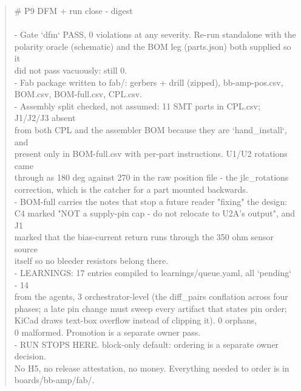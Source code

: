 \documentclass[11pt,a4paper]{article}
\begin{document}
\begin{quote}\small\ttfamily\raggedright
\# P9 DFM + run close - digest\\
~\\
- Gate `dfm` PASS, 0 violations at any severity. Re-run standalone with the\\
  polarity oracle (schematic) and the BOM leg (parts.json) both supplied so it\\
  did not pass vacuously: still 0.\\
- Fab package written to fab/: gerbers + drill (zipped), bb-amp-pos.csv,\\
  BOM.csv, BOM-full.csv, CPL.csv.\\
- Assembly split checked, not assumed: 11 SMT parts in CPL.csv; J1/J2/J3 absent\\
  from both CPL and the assembler BOM because they are `hand\_install`, and\\
  present only in BOM-full.csv with per-part instructions. U1/U2 rotations came\\
  through as 180 deg against 270 in the raw position file - the jlc\_rotations\\
  correction, which is the catcher for a part mounted backwards.\\
- BOM-full carries the notes that stop a future reader "fixing" the design:\\
  C4 marked "NOT a supply-pin cap - do not relocate to U2A's output", and J1\\
  marked that the bias-current return runs through the 350 ohm sensor source\\
  itself so no bleeder resistors belong there.\\
- LEARNINGS: 17 entries compiled to learnings/queue.yaml, all `pending` - 14\\
  from the agents, 3 orchestrator-level (the diff\_pairs conflation across four\\
  phases; a late pin change must sweep every artifact that states pin order;\\
  KiCad draws text-box overflow instead of clipping it). 0 orphans,\\
  0 malformed. Promotion is a separate owner pass.\\
- RUN STOPS HERE. block-only default: ordering is a separate owner decision.\\
  No H5, no release attestation, no money. Everything needed to order is in\\
  boards/bb-amp/fab/.
\end{quote}
\end{document}
